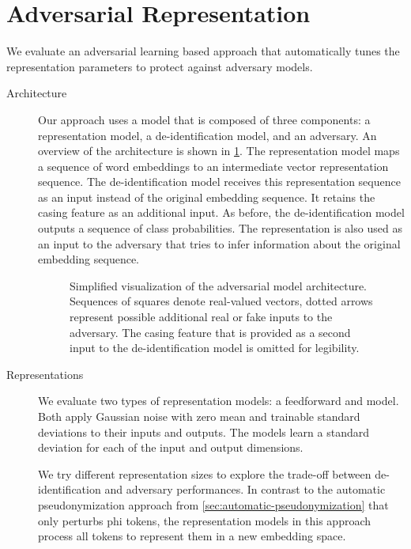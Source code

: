 
\section{Adversarial Representation}\label{sec:adversarial-representation}
%
We evaluate an adversarial learning based approach that automatically tunes the representation parameters to protect against adversary models.

\begin{description}
    \item[Architecture]
    Our approach uses a model that is composed of three components: a representation model, a de-identification model, and an adversary.
    An overview of the architecture is shown in \cref{fig:adversarial-model}.
    The representation model maps a sequence of word embeddings to an intermediate vector representation sequence.
    The de-identification model receives this representation sequence as an input instead of the original embedding sequence.
    It retains the casing feature as an additional input.
    As before, the de-identification model outputs a sequence of class probabilities.
    The representation is also used as an input to the adversary that tries to infer information about the original embedding sequence.
    
    \begin{figure}
        \centering
        
        \caption[Adversarial model architecture]{%
            Simplified visualization of the adversarial model architecture.
            Sequences of squares denote real-valued vectors, dotted arrows represent possible additional real or fake inputs to the adversary.
            The casing feature that is provided as a second input to the de-identification model is omitted for legibility.}\label{fig:adversarial-model}
    \end{figure}
    
    \item[Representations]
    We evaluate two types of representation models: a feedforward and  model.
    Both apply Gaussian noise with zero mean and trainable standard deviations to their inputs and outputs.
    The models learn a standard deviation for each of the input and output dimensions.
    
    We try different representation sizes to explore the trade-off between de-identification and adversary performances.
    In contrast to the automatic pseudonymization approach from \cref{sec:automatic-pseudonymization} that only perturbs \ac{phi} tokens, the representation models in this approach process all tokens to represent them in a new embedding space.
    

\end{description}
